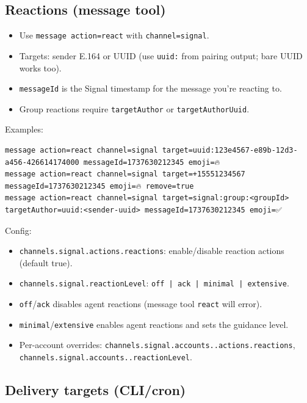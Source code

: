 \subsection{Reactions (message tool)}


\begin{itemize}
  \item Use \texttt{message action=react} with \texttt{channel=signal}.
  \item Targets: sender E.164 or UUID (use \texttt{uuid:} from pairing output; bare UUID works too).
  \item \texttt{messageId} is the Signal timestamp for the message you’re reacting to.
  \item Group reactions require \texttt{targetAuthor} or \texttt{targetAuthorUuid}.
\end{itemize}


Examples:

\begin{lstlisting}
message action=react channel=signal target=uuid:123e4567-e89b-12d3-a456-426614174000 messageId=1737630212345 emoji=🔥
message action=react channel=signal target=+15551234567 messageId=1737630212345 emoji=🔥 remove=true
message action=react channel=signal target=signal:group:<groupId> targetAuthor=uuid:<sender-uuid> messageId=1737630212345 emoji=✅
\end{lstlisting}


Config:

\begin{itemize}
  \item \texttt{channels.signal.actions.reactions}: enable/disable reaction actions (default true).
  \item \texttt{channels.signal.reactionLevel}: \texttt{off | ack | minimal | extensive}.
  \item \texttt{off}/\texttt{ack} disables agent reactions (message tool \texttt{react} will error).
  \item \texttt{minimal}/\texttt{extensive} enables agent reactions and sets the guidance level.
  \item Per-account overrides: \texttt{channels.signal.accounts..actions.reactions}, \texttt{channels.signal.accounts..reactionLevel}.
\end{itemize}


\subsection{Delivery targets (CLI/cron)}


